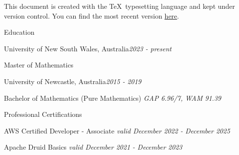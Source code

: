 \documentclass{resume} %
\begin{document}
This document is created with the \TeX \ typesetting language and kept under version control.
You can find the most recent version \href{https://github.com/joegurr/resume/blob/main/resume.pdf}{here}.


\begin{rSection}{Education}
    \begin{rSubsection}{University of New South Wales, Australia}{\em 2023 - present}{}{}
        \item Master of Mathematics
    \end{rSubsection}
    \begin{rSubsection}{University of Newcastle, Australia}{\em 2015 - 2019}{}{}
        \item Bachelor of Mathematics (Pure Mathematics) \hfill {\em GAP 6.96/7, WAM 91.39}
    \end{rSubsection}
\end{rSection}


\begin{rSection}{Professional Certifications}
    \item AWS Certified Developer - Associate \hfill {\em valid December 2022 - December 2025}
    \item Apache Druid Basics \hfill {\em valid December 2021 - December 2023}
\end{rSection}

\end{document}
